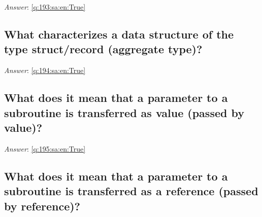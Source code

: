 \documentclass[a4paper,11pt,oneside]{article}
\begin{document}
\begin{sloppypar}
\label{q:193:sa:en:False}

\vspace{2cm}

\noindent\makebox[\textwidth]{\hrulefill}

\vspace{1cm}

\textit{Answer}: \autoref{q:193:sa:en:True}



\subsection{What characterizes a data structure of the type struct/record (aggregate type)?}

\label{q:194:sa:en:False}

\vspace{2cm}

\noindent\makebox[\textwidth]{\hrulefill}

\vspace{1cm}

\textit{Answer}: \autoref{q:194:sa:en:True}



\subsection{What does it mean that a parameter to a subroutine is transferred as value (passed by value)?}

\label{q:195:sa:en:False}

\vspace{2cm}

\noindent\makebox[\textwidth]{\hrulefill}

\vspace{1cm}

\textit{Answer}: \autoref{q:195:sa:en:True}



\subsection{What does it mean that a parameter to a subroutine is transferred as a reference (passed by reference)?}

\label{q:196:sa:en:False}

\vspace{2cm}

\noindent\makebox[\textwidth]{\hrulefill}

\vspace{1cm}


\end{sloppypar}
\end{document}
